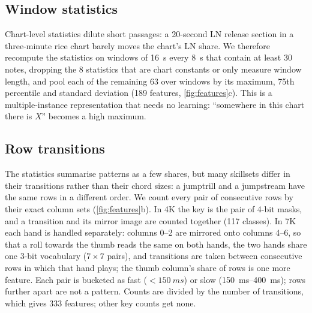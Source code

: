 \documentclass[10pt,twocolumn]{article}
\begin{document}
\subsection{Window statistics}\label{sec:windows}
Chart-level statistics dilute short passages: a 20-second LN release section in a three-minute rice chart barely moves the chart's LN share. We therefore recompute the statistics on windows of \SI{16}{s} every \SI{8}{s} that contain at least 30 notes, dropping the 8 statistics that are chart constants or only measure window length, and pool each of the remaining 63 over windows by its maximum, 75th percentile and standard deviation (189 features, \cref{fig:features}c). This is a multiple-instance representation that needs no learning: ``somewhere in this chart there is $X$'' becomes a high maximum.

\subsection{Row transitions}\label{sec:transitions}
The statistics summarise patterns as a few shares, but many skillsets differ in their transitions rather than their chord sizes: a jumptrill and a jumpstream have the same rows in a different order. We count every pair of consecutive rows by their exact column sets (\cref{fig:features}b). In 4K the key is the pair of 4-bit masks, and a transition and its mirror image are counted together (117 classes). In 7K each hand is handled separately: columns 0--2 are mirrored onto columns 4--6, so that a roll towards the thumb reads the same on both hands, the two hands share one 3-bit vocabulary ($7\times7$ pairs), and transitions are taken between consecutive rows in which that hand plays; the thumb column's share of rows is one more feature. Each pair is bucketed as fast ($<\SI{150}{ms}$) or slow (\SIrange{150}{400}{ms}); rows further apart are not a pattern. Counts are divided by the number of transitions, which gives 333 features; other key counts get none.
\end{document}
